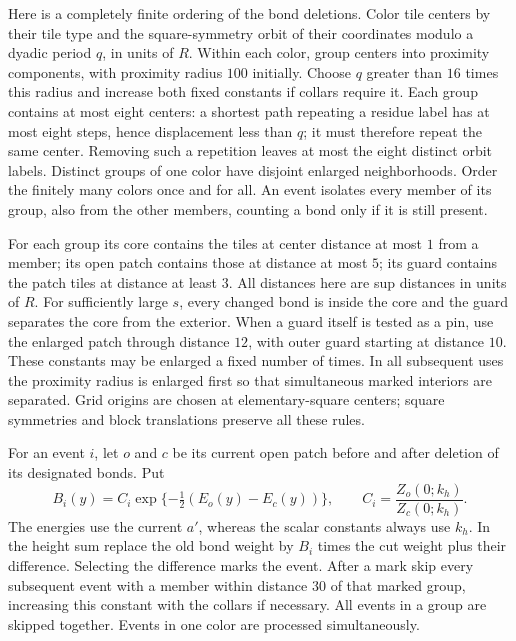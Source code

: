 Here is a completely finite ordering of the bond deletions.  Color tile
centers by their tile type and the square-symmetry orbit of their
coordinates modulo a dyadic period $q$, in units of $R$.  Within each
color, group centers into proximity components, with proximity radius
$100$ initially.  Choose $q$ greater than $16$ times this radius and
increase both fixed constants if collars require it.  Each group
contains at most eight centers: a shortest path repeating a residue
label has at most eight steps, hence displacement less than $q$;
it must therefore repeat the same center.  Removing such a repetition
leaves at most the eight distinct orbit labels.  Distinct groups of
one color have disjoint enlarged neighborhoods.  Order the finitely
many colors once and for all.  An event isolates every member of its
group, also from the other members, counting a bond only if it is
still present.

For each group its core contains the tiles at center distance at most
$1$ from a member; its open patch contains those at distance at most
$5$; its guard contains the patch tiles at distance at least $3$.
All distances here are sup distances in units of $R$.  For sufficiently
large $s$, every changed bond is inside the core and the guard separates
the core from the exterior.  When a guard itself is tested as a pin,
use the enlarged patch through distance $12$, with outer guard starting
at distance $10$.  These constants may be enlarged a fixed number of
times.  In all subsequent uses the proximity radius is enlarged first
so that simultaneous marked interiors are separated.  Grid origins
are chosen at elementary-square centers; square symmetries and block
translations preserve all these rules.

For an event $i$, let $o$ and $c$ be its current open patch before and
after deletion of its designated bonds.  Put
\begin{equation}\label{en:replacement}
 B_i(y)=C_i\exp\{-\tfrac12(E_o(y)-E_c(y))\},
 \qquad C_i=\frac{Z_o(0;k_h)}{Z_c(0;k_h)}.
\end{equation}
The energies use the current $a'$, whereas the scalar constants always
use $k_h$.  In the height sum replace the old bond weight by $B_i$ times
the cut weight plus their difference.  Selecting the difference marks
the event.  After a mark skip every subsequent event with a member
within distance $30$ of that marked group, increasing this constant
with the collars if necessary.  All events in a group are skipped
together.  Events in one color are processed simultaneously.

